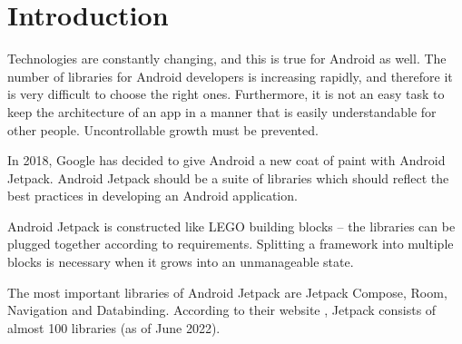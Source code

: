 \section{Introduction}
\label{cha:introduction}

Technologies are constantly changing, and this is true for Android as well. The number of libraries for Android developers is increasing rapidly, and therefore it is very difficult to choose the right ones. Furthermore, it is not an easy task to keep the architecture of an app in a manner that is easily understandable for other people. Uncontrollable growth must be prevented.

In 2018, Google has decided to give Android a new coat of paint with Android Jetpack. Android Jetpack should be a suite of libraries which should reflect the best practices in developing an Android application.

Android Jetpack is constructed like LEGO building blocks -- the libraries can be plugged together according to requirements. Splitting a framework into multiple blocks is necessary when it grows into an unmanageable state.

The most important libraries of Android Jetpack are Jetpack Compose, Room, Navigation and Databinding. According to their website \cite{android_jetpack}, Jetpack consists of almost 100 libraries (as of June 2022).

